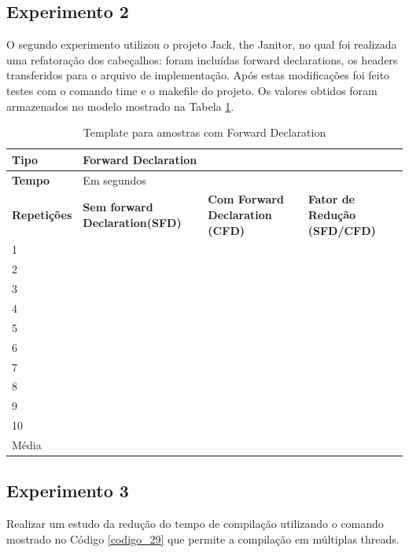 \subsection{Experimento 2}

O segundo experimento utilizou o projeto Jack, the Janitor, no qual foi
 realizada uma refatoração dos cabeçalhos: foram incluídas forward
 declarations, os headers transferidos para o arquivo de
 implementação. Após estas modificações foi feito testes com o comando
 time e o makefile do projeto. Os valores obtidos foram armazenados no
 modelo mostrado na Tabela \ref{tab:modelo_forward_declaration}.

\begin{table}[!ht]
\centering
\caption{Template para amostras com Forward Declaration}
\label{tab:modelo_forward_declaration}
\begin{tabular}{lp{3cm}p{3cm}p{3cm}}
\toprule
\textbf{Tipo} & \multicolumn{3}{l}{Forward Declaration}\\ \midrule
\textbf{Tempo}& \multicolumn{3}{l}{Em segundos}    \\ \midrule
\textbf{Repetições} & \textbf{Sem forward Declaration(SFD)} & \textbf{Com Forward Declaration (CFD)} & \textbf{Fator de Redução (SFD/CFD)} \\ \midrule
1      &   &  &  \\ \midrule
2      &   &  &  \\ \midrule
3      &   &  &  \\ \midrule
4      &   &  &  \\ \midrule
5      &   &  &  \\ \midrule
6      &   &  &  \\ \midrule
7      &   &  &  \\ \midrule
8      &   &  &  \\ \midrule
9      &   &  &  \\ \midrule
10     &   &  &  \\ \midrule
Média  &   &  &  \\ \bottomrule
\end{tabular}
\end{table}

\subsection{Experimento 3}\label{experimento_03}

Realizar um estudo da redução do tempo de compilação utilizando o comando
 mostrado no Código \ref{codigo_29} que permite a compilação em
 múltiplas threads.


